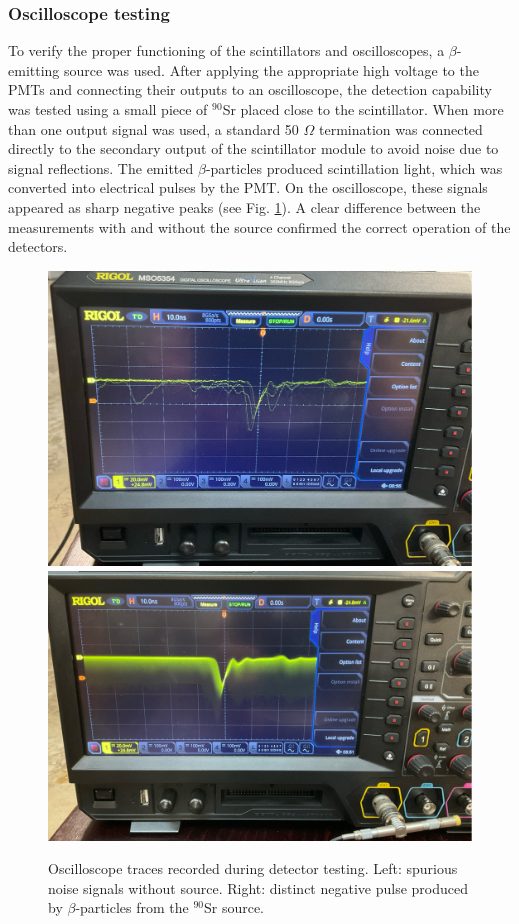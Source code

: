\documentclass[11pt,a4paper]{article}
\begin{document}
\subsubsection{Oscilloscope testing}

To verify the proper functioning of the scintillators and oscilloscopes, a $\beta$-emitting source was used. After applying the appropriate high voltage to the PMTs and connecting their outputs to an oscilloscope, the detection capability was tested using a small piece of $^{90}$Sr placed close to the scintillator. When more than one output signal was used, a standard 50 $\Omega$ termination was connected directly to the secondary output of the scintillator module to avoid noise due to signal reflections.
The emitted $\beta$-particles produced scintillation light, which was converted into electrical pulses by the PMT. On the oscilloscope, these signals appeared as sharp negative peaks (see Fig. \ref{Pulse}). A clear difference between the measurements with and without the source confirmed the correct operation of the detectors. 

\begin{figure}[h]
    \centering
    \includegraphics[width=0.45\linewidth]{Noise.jpeg}
    \includegraphics[width=0.45\linewidth]{Sr90.jpeg}
    \caption{Oscilloscope traces recorded during detector testing. Left: spurious noise signals without source. Right: distinct negative pulse produced by $\beta$-particles from the $^{90}$Sr source.}
    \label{Pulse}
\end{figure}
\end{document}
